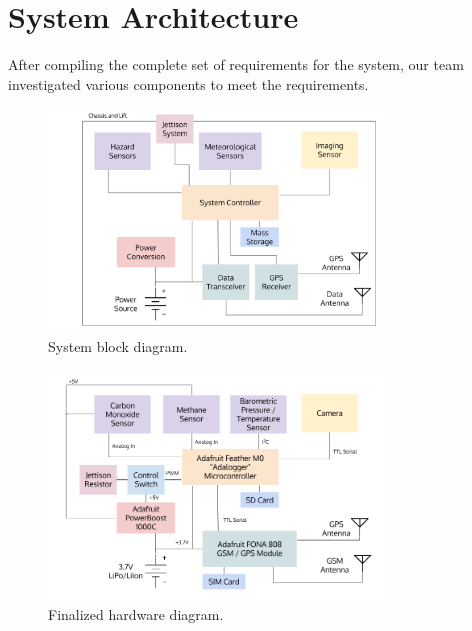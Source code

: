 \documentclass[conference,compsoc]{IEEEtran}
\begin{document}
\section{System Architecture}
After compiling the complete set of requirements for the system, our team investigated various components to meet the requirements.

\begin{figure}[!t]
\centering
\includegraphics[width=3.5in]{system_diagram.png}
\caption{System block diagram.}
\label{fig_sim}
\end{figure}

\begin{figure}[!t]
\centering
\includegraphics[width=3.5in]{hardware_diagram.png}
\caption{Finalized hardware diagram.}
\label{fig_sim}
\end{figure}
\end{document}
